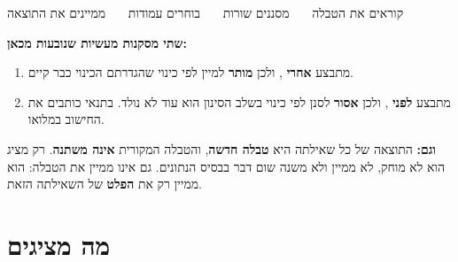 \documentclass[11pt,a4paper]{article}
\begin{document}
\vspace{3pt}
\begin{otherlanguage}{english}
\begin{center}
\end{center}
\end{otherlanguage}
\vspace{-6pt}
\begin{center}
{\small קוראים את הטבלה \ \textbullet\ \ מסננים שורות \ \textbullet\ \ בוחרים עמודות \ \textbullet\ \ ממיינים את התוצאה}
\end{center}

\vspace{4pt}
\textbf{שתי מסקנות מעשיות שנובעות מכאן:}

\begin{enumerate}[leftmargin=1.5em, itemsep=3pt, topsep=3pt]
  \item {} מתבצע \textbf{אחרי} , ולכן \textbf{מותר} למיין לפי כינוי  שהגדרתם \textendash{} הכינוי כבר קיים.
  \item {} מתבצע \textbf{לפני} , ולכן \textbf{אסור} לסנן לפי כינוי \textendash{} בשלב הסינון הוא עוד לא נולד. בתנאי כותבים את החישוב במלואו.
\end{enumerate}

\begin{panel}
\textbf{וגם:} התוצאה של כל שאילתה היא \textbf{טבלה חדשה}, והטבלה המקורית \textbf{אינה משתנה}.  רק מציג \textendash{} הוא לא מוחק, לא ממיין ולא משנה שום דבר בבסיס הנתונים. גם  אינו ממיין את הטבלה: הוא ממיין רק את \textbf{הפלט} של השאילתה הזאת.
\end{panel}

\vspace{4pt}
\section{ \textendash{} מה מציגים}
\end{document}
